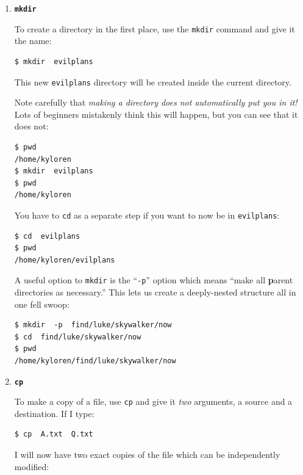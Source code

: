 \begin{enumerate}
\item \textbf{\texttt{mkdir}}

To create a directory in the first place, use the \texttt{mkdir} command and
give it the name:

\begin{Verbatim}[fontsize=\small]
$ mkdir  evilplans
\end{Verbatim}

This new \texttt{evilplans} directory will be created inside the current
directory.

Note carefully that \textit{making a directory does not automatically put you
in it!} Lots of beginners mistakenly think this will happen, but you can see
that it does not:

\begin{Verbatim}[fontsize=\small]
$ pwd
/home/kyloren
$ mkdir  evilplans
$ pwd
/home/kyloren
\end{Verbatim}

You have to \texttt{cd} as a separate step if you want to now be in
\texttt{evilplans}:

\begin{Verbatim}[fontsize=\small]
$ cd  evilplans
$ pwd
/home/kyloren/evilplans
\end{Verbatim}

A useful option to \texttt{mkdir} is the ``\texttt{-p}'' option which means
``make all \textbf{p}arent directories as necessary.'' This lets us create a
deeply-nested structure all in one fell swoop:

\begin{Verbatim}[fontsize=\small]
$ mkdir  -p  find/luke/skywalker/now
$ cd  find/luke/skywalker/now
$ pwd
/home/kyloren/find/luke/skywalker/now
\end{Verbatim}

\bigline

\item \textbf{\texttt{cp}}

To make a copy of a file, use \texttt{cp} and give it \textit{two} arguments,
a source and a destination. If I type:

\begin{Verbatim}[fontsize=\small]
$ cp  A.txt  Q.txt
\end{Verbatim}

I will now have two exact copies of the file which can be independently
modified:


\end{enumerate}
